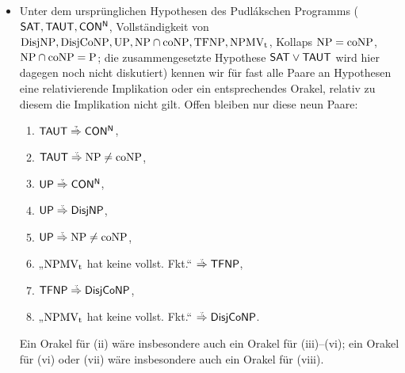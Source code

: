 \begin{itemize}[parsep=0pt,listparindent=\parindent,itemsep=5pt plus 1pt minus 1pt,midpenalty=0]
    \item Unter dem ursprünglichen Hypothesen des Pudlákschen Programms ($\mathsf{SAT}, \mathsf{TAUT}, \mathsf{CON^N}$, Vollständigkeit von $\mathrm{DisjNP}, \mathrm{DisjCoNP}, \mathrm{UP}, \mathrm{NP}\cap\mathrm{coNP}, \mathrm{TFNP}, \mathrm{NPMV_t}$, Kollaps $\mathrm{NP}=\mathrm{coNP}$, $\mathrm{NP}\cap\mathrm{coNP}=\mathrm{P}$; die zusammengesetzte Hypothese $\mathsf{SAT}\lor\mathsf{TAUT}$ wird hier dagegen noch nicht diskutiert) kennen wir für fast alle Paare an Hypothesen eine relativierende Implikation oder ein entsprechendes Orakel, relativ zu diesem die Implikation nicht gilt. Offen bleiben nur diese neun Paare:
        \begin{enumerate}[noitemsep,midpenalty=0,label=(\roman*)]
            \item $\hTAUT\stackrel{\smash{\text{\raisebox{-1pt}{\tiny ?}}}}{\Rightarrow}\mathsf{CON^N}$,
            \item $\hTAUT\stackrel{\smash{\text{\raisebox{-1pt}{\tiny ?}}}}{\Rightarrow}\NP\neq\coNP$,
            \item $\hUP\stackrel{\smash{\text{\raisebox{-1pt}{\tiny ?}}}}{\Rightarrow}\mathsf{CON^N}$,
            \item $\hUP\stackrel{\smash{\text{\raisebox{-1pt}{\tiny ?}}}}{\Rightarrow}\hDisjNP$,
            \item $\hUP\stackrel{\smash{\text{\raisebox{-1pt}{\tiny ?}}}}{\Rightarrow}\NP\neq\coNP$,
            \item „$\mathrm{NPMV_t}$ hat keine vollst. Fkt.“ $\stackrel{\smash{\text{\raisebox{-1pt}{\tiny ?}}}}{\Rightarrow} \hTFNP$,
            \item $\hTFNP\stackrel{\smash{\text{\raisebox{-1pt}{\tiny ?}}}}{\Rightarrow} \hDisjCoNP$,
            \item „$\mathrm{NPMV_t}$ hat keine vollst. Fkt.“ $\stackrel{\smash{\text{\raisebox{-1pt}{\tiny ?}}}}{\Rightarrow} \hDisjCoNP$.

        \end{enumerate}
        Ein Orakel für (ii) wäre insbesondere auch ein Orakel für (iii)–(vi); ein Orakel für (vi) oder (vii) wäre insbesondere auch ein Orakel für (viii).
        

\end{itemize}
